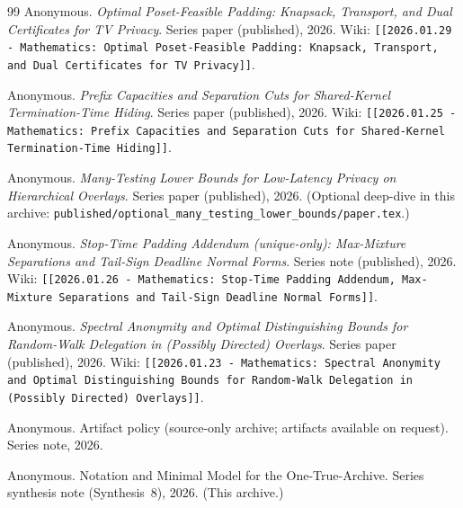 \documentclass[11pt]{article}
\begin{document}
\begin{thebibliography}{99}
Anonymous.
\newblock \emph{Optimal Poset-Feasible Padding: Knapsack, Transport, and Dual Certificates for TV Privacy}.
\newblock Series paper (published), 2026.
\newblock Wiki: \texttt{[[2026.01.29 - Mathematics: Optimal Poset-Feasible Padding: Knapsack, Transport, and Dual Certificates for TV Privacy]]}.


Anonymous.
\newblock \emph{Prefix Capacities and Separation Cuts for Shared-Kernel Termination-Time Hiding}.
\newblock Series paper (published), 2026.
\newblock Wiki: \texttt{[[2026.01.25 - Mathematics: Prefix Capacities and Separation Cuts for Shared-Kernel Termination-Time Hiding]]}.


Anonymous.
\newblock \emph{Many-Testing Lower Bounds for Low-Latency Privacy on Hierarchical Overlays}.
\newblock Series paper (published), 2026. (Optional deep-dive in this archive: \texttt{published/optional\_many\_testing\_lower\_bounds/paper.tex}.)


Anonymous.
\newblock \emph{Stop-Time Padding Addendum (unique-only): Max-Mixture Separations and Tail-Sign Deadline Normal Forms}.
\newblock Series note (published), 2026.
\newblock Wiki: \texttt{[[2026.01.26 - Mathematics: Stop-Time Padding Addendum, Max-Mixture Separations and Tail-Sign Deadline Normal Forms]]}.


Anonymous.
\newblock \emph{Spectral Anonymity and Optimal Distinguishing Bounds for Random-Walk Delegation in (Possibly Directed) Overlays}.
\newblock Series paper (published), 2026.
\newblock Wiki: \texttt{[[2026.01.23 - Mathematics: Spectral Anonymity and Optimal Distinguishing Bounds for Random-Walk Delegation in (Possibly Directed) Overlays]]}.


Anonymous.
\newblock Artifact policy (source-only archive; artifacts available on request).
\newblock Series note, 2026.

Anonymous.
\newblock Notation and Minimal Model for the One-True-Archive.
\newblock Series synthesis note (Synthesis~8), 2026. (This archive.)


\end{thebibliography}
\end{document}
